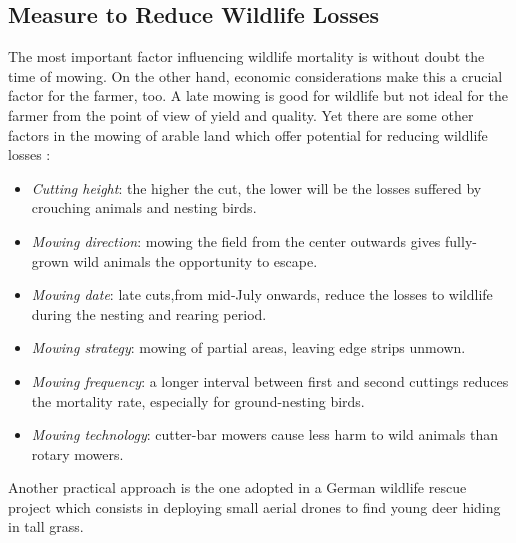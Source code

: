 \subsection{Measure to Reduce Wildlife Losses} %
\label{sub:measure_to_reduce_wildlife_losses}
 The most important factor influencing wildlife mortality is without doubt the time of mowing. On the other hand, economic considerations make this a crucial factor for the farmer, too. A late mowing is good for wildlife but not ideal for the farmer from the point of view of yield and quality. Yet there are some other factors in the mowing of arable land which offer potential for reducing wildlife losses \cite{MowlingMortality}:
\begin{itemize}
	\item \textit{Cutting height}: the higher the cut, the lower will be the losses suffered by crouching animals and nesting birds.
	\item \textit{Mowing direction}: mowing the field from the center outwards gives fully-grown wild animals the opportunity to escape.
	\item \textit{Mowing date}: late cuts,from mid-July onwards, reduce the losses to wildlife during the nesting and rearing period.
	\item \textit{Mowing strategy}: mowing of partial areas, leaving edge strips unmown.
	\item \textit{Mowing frequency}: a longer interval between first and second cuttings reduces the mortality rate, especially for ground-nesting birds.
	\item \textit{Mowing technology}: cutter-bar mowers cause less harm to wild animals than rotary mowers.
\end{itemize}
 Another practical approach is the one adopted in a German wildlife rescue project which consists in deploying small aerial drones to find young deer hiding in tall grass.

